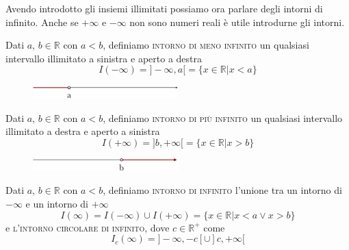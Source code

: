 Avendo introdotto gli insiemi illimitati possiamo ora parlare degli intorni 
di infinito. Anche se \(+\infty\) e \(-\infty\) non sono numeri reali è utile 
introdurne gli intorni.

\begin{definizione}
  Dati \(a,\,b\in\mathbb{R}\) con \(a<b\), definiamo \textsc{intorno di 
meno infinito} un qualsiasi intervallo illimitato a sinistra e aperto a 
destra
\begin{equation}
  I(-\infty)=]-\infty,a[=\{x\in\mathbb{R}\vert x<a\}
\end{equation}
\end{definizione}

\begin{figure}[h!]
  \centering
  \includegraphics[width=0.5\textwidth]{img/top_4.png}%
\end{figure}

\begin{definizione}
  Dati \(a,\,b\in\mathbb{R}\) con \(a<b\), definiamo \textsc{intorno di più 
infinito} un qualsiasi intervallo illimitato a destra e aperto a sinistra
\begin{equation}
  I(+\infty)=]b,+\infty[=\{x\in\mathbb{R}\vert x>b\}
\end{equation}
\end{definizione}

\begin{figure}[h!]
  \centering
  \includegraphics[width=0.5\textwidth]{img/top_5.png}%
\end{figure}

\begin{definizione}
  Dati \(a,\,b\in\mathbb{R}\) con \(a<b\), definiamo \textsc{intorno di 
infinito} l'unione tra un intorno di \(-\infty\)  e un intorno di \(+\infty\) 
\begin{equation}
  I(\infty)=I(-\infty)\cup I(+\infty)=\{x\in\mathbb{R}\vert x<a \lor 
x>b\}
\end{equation}
e \textsc{l'intorno circolare di infinito}, dove \(c\in\mathbb{R}^+\) come
\begin{equation}
  I_c(\infty)=]-\infty,-c[\cup]c,+\infty[
\end{equation}
\end{definizione}

